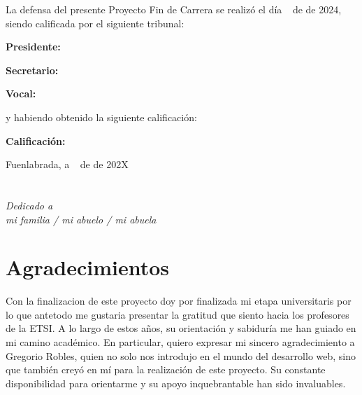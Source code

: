 \documentclass[a4paper, 12pt]{book}
\begin{document}
\vspace{1cm}
La defensa del presente Proyecto Fin de Carrera se realizó el día \qquad$\;\,$ de \qquad\qquad\qquad\qquad \newline de 2024, siendo calificada por el siguiente tribunal:


\vspace{0.5cm}
\textbf{Presidente:}

\vspace{1.2cm}
\textbf{Secretario:}

\vspace{1.2cm}
\textbf{Vocal:}


\vspace{1.2cm}
y habiendo obtenido la siguiente calificación:

\vspace{1cm}
\textbf{Calificación:}


\vspace{1cm}
\begin{flushright}
Fuenlabrada, a \qquad$\;\,$ de \qquad\qquad\qquad\qquad de 202X
\end{flushright}


\chapter*{}
\begin{flushright}
\textit{Dedicado a \\
mi familia / mi abuelo / mi abuela}
\end{flushright}


\chapter*{Agradecimientos}

Con la finalizacion de este proyecto doy por finalizada mi etapa universitaris por lo que 
antetodo me gustaria presentar la gratitud que siento hacia los profesores de la ETSI. A 
lo largo de estos años, su orientación y sabiduría me han guiado en mi camino académico. 
En particular, quiero expresar mi sincero agradecimiento a Gregorio Robles, quien no solo nos 
introdujo en el mundo del desarrollo web, sino que también creyó en mí para la realización de 
este proyecto. Su constante disponibilidad para orientarme y su apoyo inquebrantable han sido invaluables.
\end{document}
